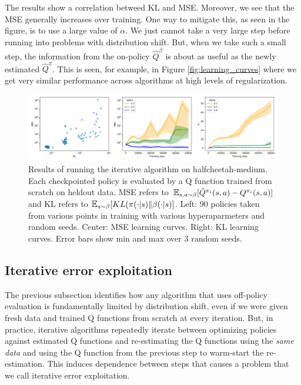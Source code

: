 The results show a correlation betweed KL and MSE. Moreover, we see that the MSE generally increases over training. One way to mitigate this, as seen in the figure, is to use a large value of $ \alpha$. We just cannot take a very large step before running into problems with distribution shift. But, when we take such a small step, the information from the on-policy $ \widehat Q^\beta$ is about as useful as the newly estimated $ \widehat Q^\pi$. This is seen, for example, in Figure \ref{fig:learning_curves} where we get very similar performance across algorithms at high levels of regularization.

\begin{figure}[h]
    \centering
    \includegraphics[width=\textwidth]{figures/offline-rl/mse/mse_vs_kl.png}
    \caption{Results of running the iterative algorithm on halfcheetah-medium. Each checkpointed policy is evaluated by a Q function trained from scratch on heldout data. MSE refers to $\E_{s,a\sim \beta}[\hat Q^{\pi_i}(s,a) - Q^{\pi_i}(s,a)]$ and KL refers to $ \E_{s\sim \beta}[KL(\pi(\cdot|s)\| \beta(\cdot|s)]$. Left: 90 policies taken from various points in training with various hyperaparmeters and random seeds. Center: MSE learning curves. Right: KL learning curves. Error bars show min and max over 3 random seeds.}
    \label{fig:mse}
\end{figure}


\subsection{Iterative error exploitation}

The previous subsection identifies how any algorithm that uses off-policy evaluation is fundamentally limited by distribution shift, even if we were given fresh data and trained Q functions from scratch at every iteration. But, in practice, iterative algorithms repeatedly iterate between optimizing policies against estimated Q functions and re-estimating the Q functions using the \emph{same data} and using the Q function from the previous step to warm-start the re-estimation. This induces dependence between steps that causes a problem that we call iterative error exploitation.


